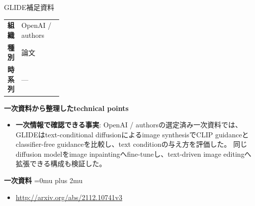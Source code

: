 \begin{technicalnote}{GLIDE}{補足資料}
\begingroup
\begin{tabularx}{\linewidth}{@{}>{\bfseries}p{0.22\linewidth}X@{}}
組織 & OpenAI / authors \\
種別 & 論文 \\
時系列 & — \\
\end{tabularx}
\smallskip
{\bfseries 一次資料から整理したtechnical points}
\begin{itemize}[leftmargin=1.5em,itemsep=0.35em]
\item \textbf{一次情報で確認できる事実}: OpenAI / authorsの選定済み一次資料では、GLIDEはtext-conditional diffusionによるimage synthesisでCLIP guidanceとclassifier-free guidanceを比較し、text conditionの与え方を評価した。 同じdiffusion modelをimage inpaintingへfine-tuneし、text-driven image editingへ拡張できる構成も検証した。
\end{itemize}
\begin{minipage}{\linewidth}
\begin{samepage}
{\bfseries 一次資料}
\begingroup\sloppy
\Urlmuskip=0mu plus 2mu\relax
\begin{itemize}[leftmargin=1.5em,itemsep=0.25em]
\item {\scriptsize\url{http://arxiv.org/abs/2112.10741v3}}
\end{itemize}
\endgroup
\end{samepage}
\end{minipage}
\endgroup
\end{technicalnote}
\medskip

